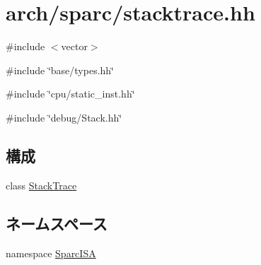 \hypertarget{sparc_2stacktrace_8hh}{
\section{arch/sparc/stacktrace.hh}
\label{sparc_2stacktrace_8hh}
}
{\ttfamily \#include $<$vector$>$}\par
{\ttfamily \#include \char`\"{}base/types.hh\char`\"{}}\par
{\ttfamily \#include \char`\"{}cpu/static\_\-inst.hh\char`\"{}}\par
{\ttfamily \#include \char`\"{}debug/Stack.hh\char`\"{}}\par
\subsection*{構成}
\begin{DoxyCompactItemize}
\item 
class \hyperlink{classSparcISA_1_1StackTrace}{StackTrace}
\end{DoxyCompactItemize}
\subsection*{ネームスペース}
\begin{DoxyCompactItemize}
\item 
namespace \hyperlink{namespaceSparcISA}{SparcISA}
\end{DoxyCompactItemize}
